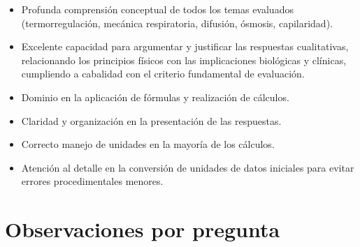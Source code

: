 \documentclass[11pt,a4paper]{article}
\begin{document}
\vspace{4pt}
\begin{minipage}[t]{0.48\linewidth}
  \begin{tcolorbox}[cajaFortaleza, title={Fortalezas}]
\begin{itemize}[leftmargin=1.5em, itemsep=2pt]
  \item Profunda comprensión conceptual de todos los temas evaluados (termorregulación, mecánica respiratoria, difusión, ósmosis, capilaridad).
  \item Excelente capacidad para argumentar y justificar las respuestas cualitativas, relacionando los principios físicos con las implicaciones biológicas y clínicas, cumpliendo a cabalidad con el criterio fundamental de evaluación.
  \item Dominio en la aplicación de fórmulas y realización de cálculos.
  \item Claridad y organización en la presentación de las respuestas.
  \item Correcto manejo de unidades en la mayoría de los cálculos.
\end{itemize}
  \end{tcolorbox}
\end{minipage}
\hfill
\begin{minipage}[t]{0.48\linewidth}
  \begin{tcolorbox}[cajaMejora, title={Areas de mejora}]
\begin{itemize}[leftmargin=1.5em, itemsep=2pt]
  \item Atención al detalle en la conversión de unidades de datos iniciales para evitar errores procedimentales menores.
\end{itemize}
  \end{tcolorbox}
\end{minipage}

\section*{Observaciones por pregunta}
\end{document}
